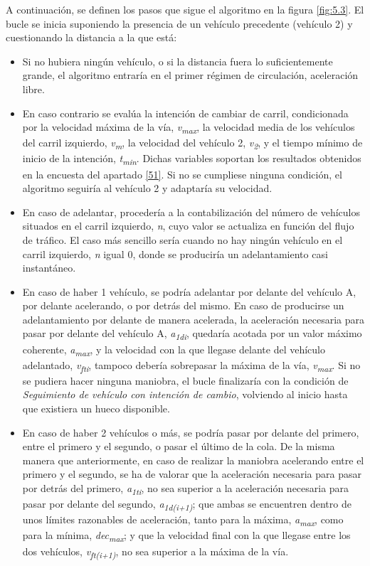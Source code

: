 A continuación, se definen los pasos que sigue el algoritmo en la figura \ref{fig:5.3}. El bucle se inicia suponiendo la presencia de un vehículo precedente (vehículo 2) y cuestionando la distancia a la que está: 
\begin{itemize}
    \item Si no hubiera ningún vehículo, o si la distancia fuera lo suficientemente grande, el algoritmo entraría en el primer régimen de circulación, aceleración libre. 
    \item En caso contrario se evalúa la intención de cambiar de carril, condicionada por la velocidad máxima de la vía, \emph{v\textsubscript{max}}, la velocidad media de los vehículos del carril izquierdo, \emph{v\textsubscript{m}}, la velocidad del vehículo 2, \emph{v\textsubscript{2}}, y el tiempo mínimo de inicio de la intención, \emph{t\textsubscript{min}}. Dichas variables soportan los resultados obtenidos en la encuesta del apartado \ref{51}. Si no se cumpliese ninguna condición, el algoritmo seguiría al vehículo 2 y adaptaría su velocidad. 
    \item En caso de adelantar, procedería a la contabilización del número de vehículos situados en el carril izquierdo, \emph{n}, cuyo valor se actualiza en función del flujo de tráfico. El caso más sencillo sería cuando no hay ningún vehículo en el carril izquierdo, \emph{n} igual 0, donde se produciría un adelantamiento casi instantáneo. 
    \item En caso de haber 1 vehículo, se podría adelantar por delante del vehículo A, por delante acelerando, o por detrás del mismo. En caso de producirse un adelantamiento por delante de manera acelerada, la aceleración necesaria para pasar por delante del vehículo A, \emph{a\textsubscript{1di}}, quedaría acotada por un valor máximo coherente, \emph{a\textsubscript{max}}, y la velocidad con la que llegase delante del vehículo adelantado, \emph{v\textsubscript{fti}}, tampoco debería sobrepasar la máxima de la vía, \emph{v\textsubscript{max}}. Si no se pudiera hacer ninguna maniobra, el bucle finalizaría con la condición de \emph{Seguimiento de vehículo con intención de cambio}, volviendo al inicio hasta que existiera un hueco disponible. 
    \item En caso de haber 2 vehículos o más, se podría pasar por delante del primero, entre el primero y el segundo, o pasar el último de la cola. De la misma manera que anteriormente, en caso de realizar la maniobra acelerando entre el primero y el segundo, se ha de valorar que la aceleración necesaria para pasar por detrás del primero, \emph{a\textsubscript{1ti}}, no sea superior a la aceleración necesaria para pasar por delante del segundo, \emph{a\textsubscript{1d(i+1)}}; que ambas se encuentren dentro de unos límites razonables de aceleración, tanto para la máxima, \emph{a\textsubscript{max}}, como para la mínima, \emph{dec\textsubscript{max}}; y que la velocidad final con la que llegase entre los dos vehículos, \emph{v\textsubscript{ft(i+1)}}, no sea superior a la máxima de la vía. 

\end{itemize}
